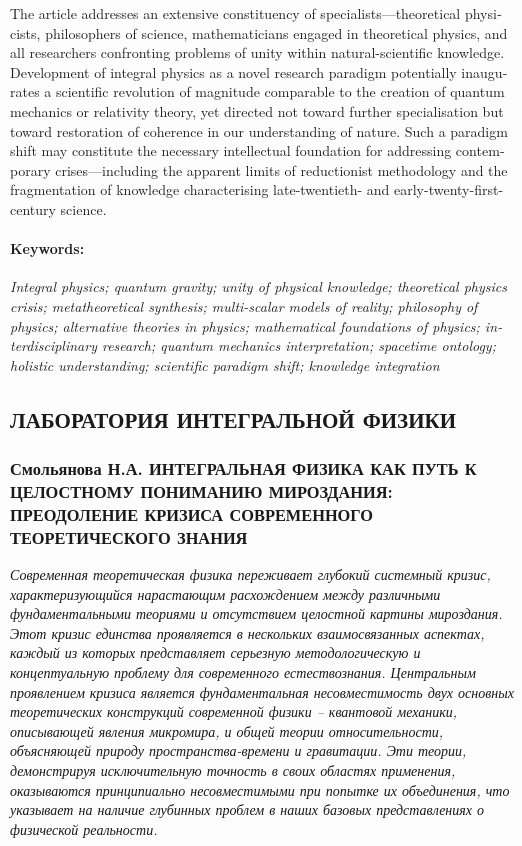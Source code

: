 \begin{english}
    The article addresses an extensive constituency of specialists—theoretical physicists, philosophers of science, mathematicians engaged in theoretical physics, and all researchers confronting problems of unity within natural-scientific knowledge. Development of integral physics as a novel research paradigm potentially inaugurates a scientific revolution of magnitude comparable to the creation of quantum mechanics or relativity theory, yet directed not toward further specialisation but toward restoration of coherence in our understanding of nature. Such a paradigm shift may constitute the necessary intellectual foundation for addressing contemporary crises—including the apparent limits of reductionist methodology and the fragmentation of knowledge characterising late-twentieth- and early-twenty-first-century science.

    \paragraph{Keywords:} \textit{Integral physics; quantum gravity; unity of physical knowledge; theoretical physics crisis; metatheoretical synthesis; multi-scalar models of reality; philosophy of physics; alternative theories in physics; mathematical foundations of physics; interdisciplinary research; quantum mechanics interpretation; spacetime ontology; holistic understanding; scientific paradigm shift; knowledge integration}
    \end{english}
\else
    \subsection{ЛАБОРАТОРИЯ ИНТЕГРАЛЬНОЙ ФИЗИКИ}
    \label{subsec:smolyanova-ru}

    \subsubsection{Смольянова Н.А. ИНТЕГРАЛЬНАЯ ФИЗИКА КАК ПУТЬ К ЦЕЛОСТНОМУ ПОНИМАНИЮ МИРОЗДАНИЯ: ПРЕОДОЛЕНИЕ КРИЗИСА СОВРЕМЕННОГО ТЕОРЕТИЧЕСКОГО ЗНАНИЯ}
    \label{subsubsec:smolyanova-title-ru}

    \textit{Современная теоретическая физика переживает глубокий системный кризис, характеризующийся нарастающим расхождением между различными фундаментальными теориями и отсутствием целостной картины мироздания. Этот кризис единства проявляется в нескольких взаимосвязанных аспектах, каждый из которых представляет серьезную методологическую и концептуальную проблему для современного естествознания. Центральным проявлением кризиса является фундаментальная несовместимость двух основных теоретических конструкций современной физики – квантовой механики, описывающей явления микромира, и общей теории относительности, объясняющей природу пространства-времени и гравитации. Эти теории, демонстрируя исключительную точность в своих областях применения, оказываются принципиально несовместимыми при попытке их объединения, что указывает на наличие глубинных проблем в наших базовых представлениях о физической реальности.}

